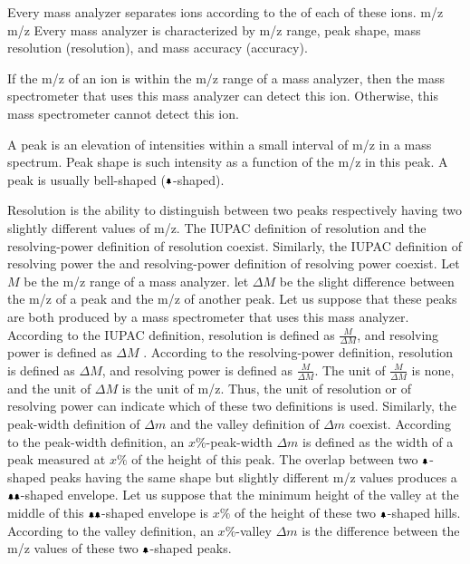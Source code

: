 Every mass analyzer separates ions according to the  of each of these ions. 
\Gls{m/z} \glsdesc{m/z} %
Every mass analyzer is characterized by \gls{m/z} range, peak shape, mass resolution (resolution), and mass accuracy (accuracy).

If the \gls{m/z} of an ion is within the \gls{m/z} range of a mass analyzer, 
	then the mass spectrometer that uses this mass analyzer can detect this ion.
Otherwise, this mass spectrometer cannot detect this ion.

A peak is an elevation of intensities within a small interval of \gls{m/z} in a mass spectrum.
Peak shape is such intensity as a function of the \gls{m/z} in this peak. 
A peak is usually bell-shaped (\(\bell\)-shaped).

Resolution is the ability to distinguish between two peaks respectively having two slightly different values of \gls{m/z}.
The IUPAC definition of resolution and the resolving-power definition of resolution coexist.
Similarly, the IUPAC definition of resolving power the and resolving-power definition of resolving power coexist.
Let \(M\) be the \gls{m/z} range of a mass analyzer. 
let \(\Delta{}M\) be the slight difference between the \gls{m/z} of a peak and the \gls{m/z} of another peak.
Let us suppose that these peaks are both produced by a mass spectrometer that uses this mass analyzer. 
According to the IUPAC definition, resolution is defined as \(\frac{M}{\Delta{}M}\), and resolving power is defined as \(\Delta{}M\) \cite{mcnaught1997compendium}.
According to the resolving-power definition, resolution is defined as \(\Delta{}M\), and resolving power is defined as \(\frac{M}{\Delta{}M}\).
The unit of \(\frac{M}{\Delta{}M}\) is none, and the unit of \(\Delta{}M\) is the unit of \gls{m/z}.
Thus, the unit of resolution or of resolving power can indicate which of these two definitions is used. 
Similarly, the peak-width definition of \(\Delta{}m\) and the valley definition of \(\Delta{}m\) coexist. 
According to the peak-width definition, an \(x\%\)-peak-width \(\Delta{}m\) is defined as the width of a peak measured at \(x\%\) of the height of this peak.
The overlap between two \(\bell\)-shaped peaks having the same shape but slightly different \gls{m/z} values produces a \({\bell}{\bell}\)-shaped envelope.
Let us suppose that the minimum height of the valley at the middle of this \({\bell}{\bell}\)-shaped envelope is \(x\%\) of the height of these two \(\bell\)-shaped hills.
According to the valley definition, an \(x\%\)-valley \(\Delta{}m\) is the difference between the \gls{m/z} values of these two \(\bell\)-shaped peaks.

